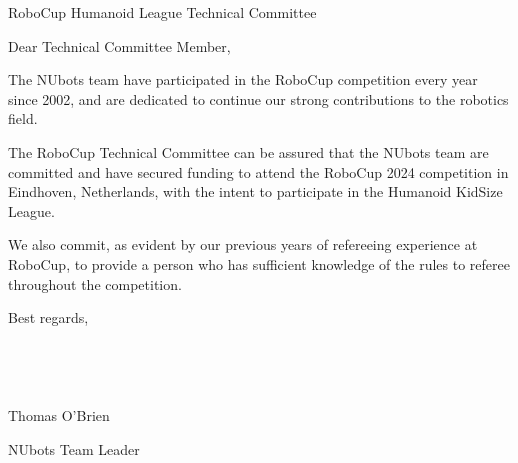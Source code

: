 \documentclass{letter}
\begin{document}
\begin{letter}{RoboCup Humanoid League Technical Committee}
\opening{Dear Technical Committee Member,}

The NUbots team have participated in the RoboCup competition every year since 2002, and are dedicated to continue our strong contributions to the robotics field.

The RoboCup Technical Committee can be assured that the NUbots team are committed and have secured funding to attend the RoboCup 2024 competition in Eindhoven, Netherlands, with the intent to participate in the Humanoid KidSize League.

We also commit, as evident by our previous years of refereeing experience at RoboCup, to provide a person who has sufficient knowledge of the rules to referee throughout the competition.

Best regards, \\ \\ \\ \\ \\ 

\hspace*{20pt} Thomas O'Brien

NUbots Team Leader

\end{letter}
\end{document}
